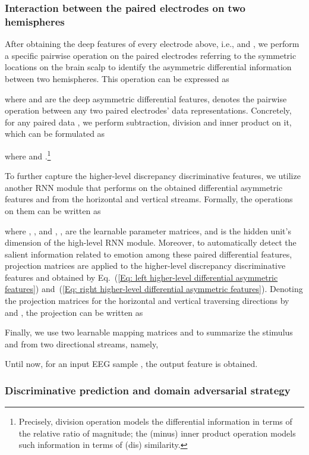 \documentclass[journal]{IEEEtran}
\begin{document}
\subsubsection{Interaction between the paired electrodes on two hemispheres}

After obtaining the deep features of every electrode above, i.e.,  and , we perform a specific pairwise operation on the paired electrodes referring to the symmetric locations on the brain scalp to identify the asymmetric differential information between two hemispheres. This operation can be expressed as
 
where  and  are the deep asymmetric differential features,  denotes the pairwise operation between any two paired electrodes' data representations. Concretely, for any paired data , we perform subtraction, division and inner product on it, which can be formulated as

where  and .\footnote{Precisely, division operation models the differential information in terms of the relative ratio of magnitude; the (minus) inner product operation models such information in terms of (dis) similarity.}

To further capture the higher-level discrepancy discriminative features, we utilize another RNN module that performs on the obtained differential asymmetric features  and  from the horizontal and vertical streams. Formally, the operations on them can be written as
 
where , ,  and , ,  are the learnable parameter matrices, and  is the hidden unit's dimension of the high-level RNN module. Moreover, to automatically detect the salient information related to emotion among these paired differential features, projection matrices are applied to the higher-level discrepancy discriminative features  and  obtained by Eq.~(\ref{Eq: left higher-level differential asymmetric features}) and~(\ref{Eq: right higher-level differential asymmetric features}). Denoting the projection matrices for the horizontal and vertical traversing directions by  and , the projection can be written as	
 

Finally, we use two learnable mapping matrices  and  to summarize the stimulus  and  from two directional streams, namely,
 
Until now, for an input EEG sample , the output feature  is obtained.	

\subsubsection{Discriminative prediction and domain adversarial strategy}
\end{document}
